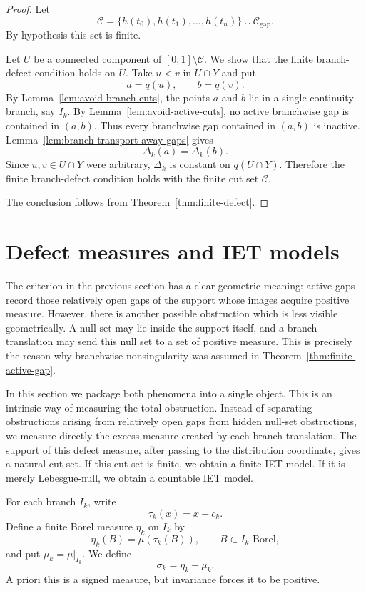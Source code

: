 \documentclass[11pt]{amsart}
\theoremstyle{plain}
\theoremstyle{definition}
\theoremstyle{remark}
\newcommand{\cC}{\mathcal C}
\begin{document}
\begin{proof}
Let
\[
        \cC=\{h(t_0),h(t_1),\ldots,h(t_n)\}\cup\cC_{\mathrm{gap}}.
\]
By hypothesis this set is finite.

Let $U$ be a connected component of $[0,1]\setminus\cC$. We show that the finite branch-defect condition holds on $U$. Take $u<v$ in $U\cap Y$ and put
\[
        a=q(u),\qquad b=q(v).
\]
By Lemma~\ref{lem:avoid-branch-cuts}, the points $a$ and $b$ lie in a single continuity branch, say $I_k$. By Lemma~\ref{lem:avoid-active-cuts}, no active branchwise gap is contained in $(a,b)$. Thus every branchwise gap contained in $(a,b)$ is inactive. Lemma~\ref{lem:branch-transport-away-gaps} gives
\[
        \Delta_k(a)=\Delta_k(b).
\]
Since $u,v\in U\cap Y$ were arbitrary, $\Delta_k$ is constant on $q(U\cap Y)$. Therefore the finite branch-defect condition holds with the finite cut set $\cC$.

The conclusion follows from Theorem~\ref{thm:finite-defect}.
\end{proof}


\section{Defect measures and IET models}\label{sec:defect-measures}

The criterion in the previous section has a clear geometric meaning: active gaps
record those relatively open gaps of the support whose images acquire positive measure. However,
there is another possible obstruction which is less visible geometrically. A null set
may lie inside the support itself, and a branch translation may send this null set to a
set of positive measure. This is precisely the reason why branchwise nonsingularity was
assumed in Theorem~\ref{thm:finite-active-gap}.

In this section we package both phenomena into a single object. This is an intrinsic way
of measuring the total obstruction. Instead of separating obstructions arising from relatively open gaps from hidden
null-set obstructions, we measure directly the excess measure created by each branch
translation. The support of this defect measure, after passing to the distribution coordinate,
gives a natural cut set. If this cut set is finite, we obtain a finite IET model. If it is merely
Lebesgue-null, we obtain a countable IET model.

For each branch \(I_k\), write
\[
        \tau_k(x)=x+c_k.
\]
Define a finite Borel measure \(\eta_k\) on \(I_k\) by
\[
        \eta_k(B)=\mu(\tau_k(B)),
        \qquad B\subset I_k \text{ Borel},
\]
and put \(\mu_k=\mu|_{I_k}\). We define
\[
        \sigma_k=\eta_k-\mu_k.
\]
A priori this is a signed measure, but invariance forces it to be positive.
\end{document}
